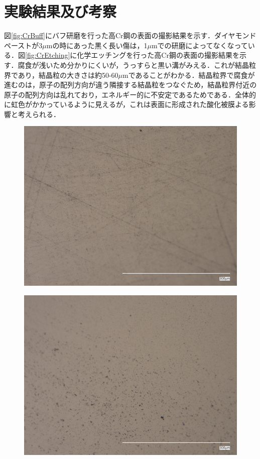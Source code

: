 \section{実験結果及び考察}
図\ref{fig:CrBuff}にバフ研磨を行った高Cr鋼の表面の撮影結果を示す．ダイヤモンドペーストが3$\mu$mの時にあった黒く長い傷は，1$\mu$mでの研磨によってなくなっている．図\ref{fig:CrEtching}に化学エッチングを行った高Cr鋼の表面の撮影結果を示す．腐食が浅いため分かりにくいが，うっすらと黒い溝がみえる．これが結晶粒界であり，結晶粒の大きさは約50-60$\mu$mであることがわかる．結晶粒界で腐食が進むのは，原子の配列方向が違う隣接する結晶粒をつなぐため，結晶粒界付近の原子の配列方向は乱れており，エネルギー的に不安定であるためである\cite{ミスミ}．全体的に虹色がかかっているように見えるが，これは表面に形成された酸化被膜よる影響と考えられる．

\begin{figure}[htbp]
    \begin{minipage}[htbp]{0.45\linewidth}
      \centering
      \includegraphics[keepaspectratio, scale=0.07]{fig/241218_9Cr_3um.jpg}
      \label{fig:Cr3um}
    \end{minipage}
    \begin{minipage}[htbp]{0.45\linewidth}
      \centering
      \includegraphics[keepaspectratio, scale=0.07]{fig/241218_9Cr_1um.jpg}

\end{minipage}
\end{figure}
